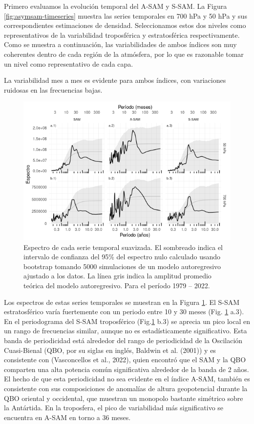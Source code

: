 \documentclass[12pt,oneside]{reedthesis}
\begin{document}
Primero evaluamos la evolución temporal del A-SAM y S-SAM.
La Figura \ref{fig:asymsam-timeseries} muestra las series temporales en 700 hPa y 50 hPa y sus correspondientes estimaciones de densidad.
Seleccionamos estos dos niveles como representativos de la variabilidad troposférica y estratosférica respectivamente.
Como se muestra a continuación, las variabilidades de ambos índices son muy coherentes dentro de cada región de la atmósfera, por lo que es razonable tomar un nivel como representativo de cada capa.

La variabilidad mes a mes es evidente para ambos índices, con variaciones ruidosas en las frecuencias bajas.






\begin{figure}
\includegraphics{figures/30-sam/spectrum-1} \caption{Espectro de cada serie temporal suavizada.
El sombreado indica el intervalo de confianza del 95\% del espectro nulo calculado usando bootstrap tomando 5000 simulaciones de un modelo autoregresivo ajustado a los datos.
La línea gris indica la amplitud promedio teórica del modelo autoregresivo.
Para el período 1979 -- 2022.}\label{fig:spectrum}
\end{figure}

Los espectros de estas series temporales se muestran en la Figura \ref{fig:spectrum}.
El S-SAM estratosférico varía fuertemente con un periodo entre 10 y 30 meses (Fig. \ref{fig:spectrum} a.3).
En el periodograma del S-SAM troposférico (Fig.\ref{fig:spectrum} b.3) se aprecia un pico local en un rango de frecuencias similar, aunque no es estadísticamente significativo.
Esta banda de periodicidad está alrededor del rango de periodicidad de la Oscilación Cuasi-Bienal (QBO, por su siglas en inglés, Baldwin et al. (2001)) y es consistente con (Vasconcellos et al., 2022), quien encontró que el SAM y la QBO comparten una alta potencia común significativa alrededor de la banda de 2 años.
El hecho de que esta periodicidad no sea evidente en el índice A-SAM, también es consistente con sus composiciones de anomalías de altura geopotencial durante la QBO oriental y occidental, que muestran un monopolo bastante simétrico sobre la Antártida.
En la troposfera, el pico de variabilidad más significativo se encuentra en A-SAM en torno a 36 meses.
\end{document}
